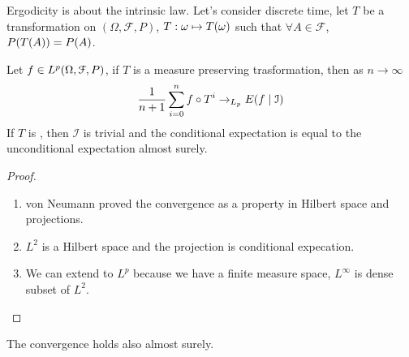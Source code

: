 Ergodicity is about the intrinsic law. Let's consider discrete time, let \(T\) be a  transformation on \((\Omega, \mathcal{F}, P)\), \(T : \omega \mapsto T\pqty{\omega}\) such that \(\forall A \in \mathcal{F}\), \(P\pqty{T(A)} = P(A)\). 

\begin{thm}
    Let \(f\in L^{p}\pqty{\Omega, \mathcal{F}, P}\), if \(T\) is a measure preserving trasformation, then as \(n \to \infty\) 
    \begin{equation*}
        \frac{1}{n+1} \sum^{n}_{i= 0} f\circ T^{i}\to_{L_{p}} E\pqty{f \mid \mathcal{I}}
    \end{equation*}
    If \(T\) is , then \(\mathcal{I}\) is trivial and the conditional expectation is equal to the unconditional expectation almost surely. 
\end{thm}
\begin{proof}
    \begin{enumerate}
        \item von Neumann proved the convergence as a property in Hilbert space and projections. 
        \item \(L^{2}\) is a Hilbert space and the projection is conditional expecation. 
        \item We can extend to \(L^{p}\) because we have a finite measure space, \(L^{\infty}\) is dense subset of \(L^{2}\).  
    \end{enumerate}
\end{proof}

\begin{thm}
    The convergence holds also almost surely. 
\end{thm}